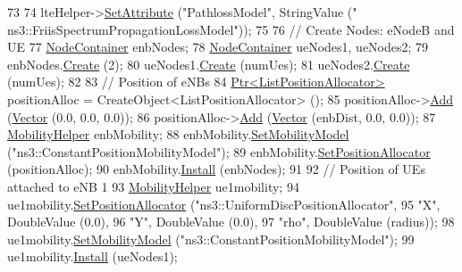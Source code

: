 \begin{DoxyCode}
73   
74   lteHelper->\hyperlink{classns3_1_1ObjectBase_ac60245d3ea4123bbc9b1d391f1f6592f}{SetAttribute} (\textcolor{stringliteral}{"PathlossModel"}, StringValue (\textcolor{stringliteral}{"
      ns3::FriisSpectrumPropagationLossModel"}));
75 
76   \textcolor{comment}{// Create Nodes: eNodeB and UE}
77   \hyperlink{classns3_1_1NodeContainer}{NodeContainer} enbNodes;
78   \hyperlink{classns3_1_1NodeContainer}{NodeContainer} ueNodes1, ueNodes2;
79   enbNodes.\hyperlink{classns3_1_1NodeContainer_a787f059e2813e8b951cc6914d11dfe69}{Create} (2);
80   ueNodes1.\hyperlink{classns3_1_1NodeContainer_a787f059e2813e8b951cc6914d11dfe69}{Create} (numUes);
81   ueNodes2.\hyperlink{classns3_1_1NodeContainer_a787f059e2813e8b951cc6914d11dfe69}{Create} (numUes);
82 
83   \textcolor{comment}{// Position of eNBs}
84   \hyperlink{classns3_1_1Ptr}{Ptr<ListPositionAllocator>} positionAlloc = CreateObject<ListPositionAllocator> 
      ();
85   positionAlloc->\hyperlink{classns3_1_1ListPositionAllocator_a460e82f015ac012a73ba0ea0cccb3486}{Add} (\hyperlink{classns3_1_1Vector3D_a7e59b47bc94c9cb1dadff68c1d0112d8}{Vector} (0.0, 0.0, 0.0));
86   positionAlloc->\hyperlink{classns3_1_1ListPositionAllocator_a460e82f015ac012a73ba0ea0cccb3486}{Add} (\hyperlink{classns3_1_1Vector3D_a7e59b47bc94c9cb1dadff68c1d0112d8}{Vector} (enbDist, 0.0, 0.0));
87   \hyperlink{classns3_1_1MobilityHelper}{MobilityHelper} enbMobility;
88   enbMobility.\hyperlink{classns3_1_1MobilityHelper_a030275011b6f40682e70534d30280aba}{SetMobilityModel} (\textcolor{stringliteral}{"ns3::ConstantPositionMobilityModel"});
89   enbMobility.\hyperlink{classns3_1_1MobilityHelper_ac59d5295076be3cc11021566713a28c5}{SetPositionAllocator} (positionAlloc);
90   enbMobility.\hyperlink{classns3_1_1MobilityHelper_a07737960ee95c0777109cf2994dd97ae}{Install} (enbNodes);
91 
92   \textcolor{comment}{// Position of UEs attached to eNB 1}
93   \hyperlink{classns3_1_1MobilityHelper}{MobilityHelper} ue1mobility;
94   ue1mobility.\hyperlink{classns3_1_1MobilityHelper_ac59d5295076be3cc11021566713a28c5}{SetPositionAllocator} (\textcolor{stringliteral}{"ns3::UniformDiscPositionAllocator"},
95                                     \textcolor{stringliteral}{"X"}, DoubleValue (0.0),
96                                     \textcolor{stringliteral}{"Y"}, DoubleValue (0.0),
97                                     \textcolor{stringliteral}{"rho"}, DoubleValue (radius));
98   ue1mobility.\hyperlink{classns3_1_1MobilityHelper_a030275011b6f40682e70534d30280aba}{SetMobilityModel} (\textcolor{stringliteral}{"ns3::ConstantPositionMobilityModel"});
99   ue1mobility.\hyperlink{classns3_1_1MobilityHelper_a07737960ee95c0777109cf2994dd97ae}{Install} (ueNodes1);

\end{DoxyCode}
